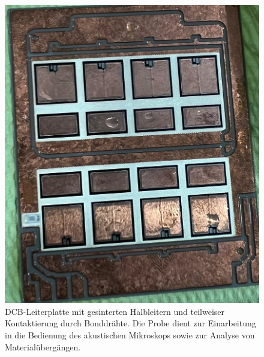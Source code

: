 \begin{figure}[htbp]
    \centering
    \includegraphics[scale=0.12]{Bilder/probe1}
    \caption{DCB-Leiterplatte mit gesinterten Halbleitern und teilweiser Kontaktierung durch Bonddrähte. Die Probe dient zur Einarbeitung in die Bedienung des akustischen Mikroskops sowie zur Analyse von Materialübergängen.}
    
    \vspace{0.2cm}
    \label{Abb.3: DCB-Leiterplatte mit gesinterten Halbleitern und teilweiser Kontaktierung durch Bonddrähte. Die Probe dient zur Einarbeitung in die Bedienung des akustischen Mikroskops sowie zur Analyse von Materialübergängen. }
\end{figure} 
\vspace{0.2cm}
